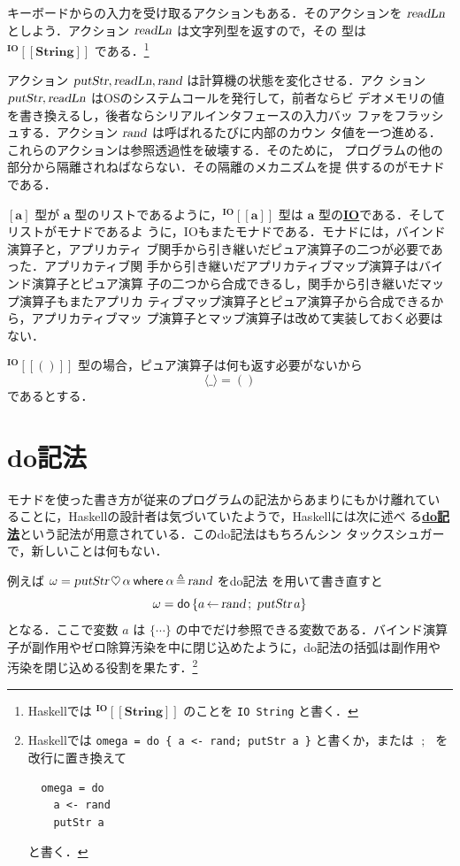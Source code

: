 \documentclass[a5paper,twoside,fleqn,draft]{jsbook}
\def\[{\left[\!\left[}
\def\]{\right]\!\right]}
\newcommand{\programminglanguage}[1]{\textsf{#1}}
\newcommand{\haskell}{\programminglanguage{Haskell}}
\newcommand{\keyword}[1]{{\underline{\textbf{#1}}}}
\newcommand{\code}[1]{\texttt{#1}}
\newcommand{\mKeyword}[1]{\mathsf{#1}} %
\newcommand{\mDoKeyword}{\mKeyword{do}}
\newcommand{\mWhereKeyword}{\mKeyword{where}}
\DeclareMathOperator{\mDoKW}{\mDoKeyword}
\newcommand{\mAnyParam}{\_}
\newcommand{\mAction}[1]{\textsl{#1}}
\DeclareMathOperator{\mReadLn}{\mAction{readLn}}
\DeclareMathOperator{\mPutStr}{\mAction{putStr}}
\DeclareMathOperator{\mRand}{\mAction{rand}}
\DeclareMathOperator{\mBind}{\heartsuit}
\DeclareMathOperator{\mDoEq}{\leftarrow}
\DeclareMathOperator{\mDoNext}{;\;}%
\DeclareMathOperator{\mLetEq}{\triangleq}
\newcommand{\mType}[1]{\mathbf{#1}}
\newcommand{\mStringType}{\mType{String}}
\newcommand{\mUnitType}{\mType{()}}
\newcommand{\mListType}[1]{[\mType{#1}]}
\newcommand{\mGenericTypeAssemble}[2]{{}^{\mType{#1}}\[\mType{#2}\]}
\newcommand{\mIOType}[1]{\mGenericTypeAssemble{IO}{#1}}
\newcommand{\mIOStringType}{\mIOType{\mStringType}}
\newcommand{\mIOUnitType}{\mIOType{\mUnitType}}
\newcommand{\mPureWith}[1]{\langle#1\rangle}
\newcommand{\mTupleWith}[1]{\left(#1\right)}
\newcommand{\mDo}[1]{\mDoKW\left\{#1\right\}}
\newcommand{\mWhereIs}[2]{\mathbin{\mWhereKeyword}#1\mLetEq#2}
\begin{document}
キーボードからの入力を受け取るアクションもある．そのアクションを
$\mReadLn$ としよう．アクション $\mReadLn$ は文字列型を返すので，その
型は $\mIOStringType$ である．\footnote{\haskell では $\mIOStringType$
のことを \code{IO String} と書く．}

アクション $\mPutStr,\mReadLn,\mRand$ は計算機の状態を変化させる．アク
ション $\mPutStr,\mReadLn$ はOSのシステムコールを発行して，前者ならビ
デオメモリの値を書き換えるし，後者ならシリアルインタフェースの入力バッ
ファをフラッシュする．アクション $\mRand$ は呼ばれるたびに内部のカウン
タ値を一つ進める．これらのアクションは参照透過性を破壊する．そのために，
プログラムの他の部分から隔離されねばならない．その隔離のメカニズムを提
供するのがモナドである．

$\mListType{a}$ 型が $\mType{a}$ 型のリストであるように，$\mIOType{a}$
型は $\mType{a}$ 型の\keyword{IO}である．そしてリストがモナドであるよ
うに，IOもまたモナドである．モナドには，バインド演算子と，アプリカティ
ブ関手から引き継いだピュア演算子の二つが必要であった．アプリカティブ関
手から引き継いだアプリカティブマップ演算子はバインド演算子とピュア演算
子の二つから合成できるし，関手から引き継いだマップ演算子もまたアプリカ
ティブマップ演算子とピュア演算子から合成できるから，アプリカティブマッ
プ演算子とマップ演算子は改めて実装しておく必要はない．

$\mIOUnitType$ 型の場合，ピュア演算子は何も返す必要がないから
\begin{equation}
\mPureWith{\mAnyParam}=()
\end{equation}
であるとする．





\section{do記法}

モナドを使った書き方が従来のプログラムの記法からあまりにもかけ離れてい
ることに，\haskell の設計者は気づいていたようで，\haskell には次に述べ
る\keyword{do記法}という記法が用意されている．このdo記法はもちろんシン
タックスシュガーで，新しいことは何もない．

例えば $\omega=\mPutStr\mBind\alpha\mWhereIs{\alpha}{\mRand}$ をdo記法
を用いて書き直すと
\begin{equation}
\label{eq:do-print-random}
\omega=\mDo{a\mDoEq\mRand\mDoNext\mPutStr a}
\end{equation}
となる．ここで変数 $a$ は $\{\dotsb\}$ の中でだけ参照できる変数である．バインド演算子が副作用やゼロ除算汚染を中に閉じ込めたように，do記法の括弧は副作用や汚染を閉じ込める役割を果たす．\footnote{\haskell では \code{omega = do \{ a <- rand; putStr
a \}} と書くか，または $\mDoNext$ を改行に置き換えて
\begin{verbatim}
  omega = do
    a <- rand
    putStr a
\end{verbatim}
と書く．}
\end{document}
